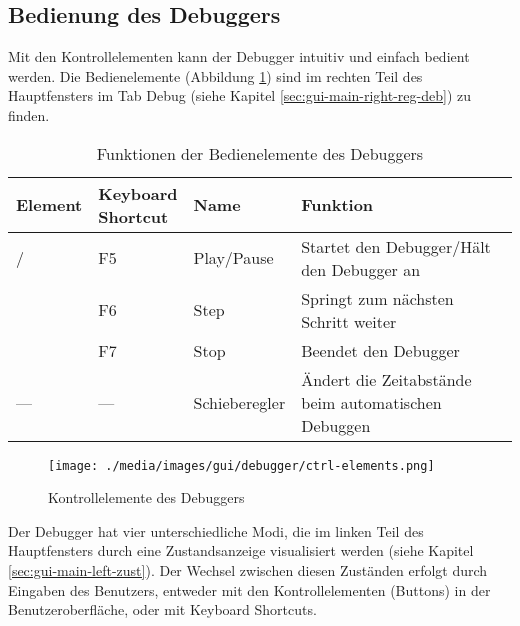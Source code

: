 
\subsection{Bedienung des Debuggers}
\label{sec:deb-use}
Mit den Kontrollelementen kann der Debugger intuitiv und einfach bedient werden. Die Bedienelemente (Abbildung \ref{fig:deb-gui-ctrl}) sind im rechten Teil des Hauptfensters im Tab \glqq{}Debug\grqq{} (siehe Kapitel \ref{sec:gui-main-right-reg-deb}) zu finden.

\def\arraystretch{1.4}
\begin{table}[h]
\begin{tabular}{|l|l|l|l|}
	\hline
	Element & \parbox{2cm}{Keyboard\\Shortcut}& Name & Funktion\\
	\hline
	 / \thinspace {} & F5 & Play/Pause & Startet den Debugger/Hält den Debugger an\\
	\thinspace {} & F6 & Step & Springt zum nächsten Schritt weiter\\
	 & F7 & Stop & Beendet den Debugger\\
	--- & --- & Schieberegler & \parbox{7cm}{Ändert die Zeitabstände beim automatischen Debuggen}\\
	\hline
\end{tabular}
\caption{Funktionen der Bedienelemente des Debuggers}\label{tab:deb-ctrl}
\end{table}



\begin{figure}[h]
\centering
\texttt{[image: ./media/images/gui/debugger/ctrl-elements.png]}
\caption{Kontrollelemente des Debuggers}
\label{fig:deb-gui-ctrl}
\end{figure}

Der Debugger hat vier unterschiedliche Modi, die im linken Teil des Hauptfensters durch eine Zustandsanzeige visualisiert werden (siehe Kapitel \ref{sec:gui-main-left-zust}). Der Wechsel zwischen diesen Zuständen erfolgt durch Eingaben des Benutzers, entweder mit den Kontrollelementen (Buttons) in der Benutzeroberfläche, oder mit Keyboard Shortcuts.

